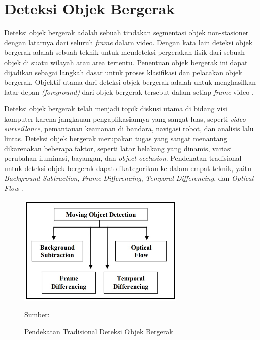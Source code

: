 \section{Deteksi Objek Bergerak}
    Deteksi objek bergerak adalah sebuah tindakan segmentasi objek non-stasioner dengan latarnya dari seluruh \textit{frame} dalam video. Dengan kata lain deteksi objek bergerak adalah sebuah teknik untuk mendeteksi pergerakan fisik dari sebuah objek di suatu wilayah atau area tertentu. Penentuan objek bergerak ini dapat dijadikan sebagai langkah dasar untuk proses klasifikasi dan pelacakan objek bergerak. Objektif utama dari deteksi objek bergerak adalah untuk menghasilkan latar depan \textit{(foreground)} dari objek bergerak tersebut dalam setiap \textit{frame} video \citep{Kulchandani2015}. 
    
    Deteksi objek bergerak telah menjadi topik diskusi utama di bidang visi komputer karena jangkauan pengaplikasiannya yang sangat luas, seperti \textit{video surveillance}, pemantauan keamanan di bandara, navigasi robot, dan analisis lalu lintas. Deteksi objek bergerak merupakan tugas yang sangat menantang dikarenakan beberapa faktor, seperti latar belakang yang dinamis, variasi perubahan iluminasi, bayangan, dan \textit{object occlusion}. Pendekatan tradisional untuk deteksi objek bergerak dapat dikategorikan ke dalam empat teknik, yaitu \textit{Background Subtraction}, \textit{Frame Differencing}, \textit{Temporal Differencing}, dan \textit{Optical Flow} \citep{Kulchandani2015}.
    
    \begin{figure}[H]
    \centering
      \singlespacing
      \includegraphics[width=8cm]{image/FourTraditionalMovingObjectDetection.jpg}
      \caption{Pendekatan Tradisional Deteksi Objek Bergerak}
      \small{Sumber: \citet{Kulchandani2015}}
      \label{fig:Pendekatan Tradisional Deteksi Objek Bergerak}
    \end{figure}
  
